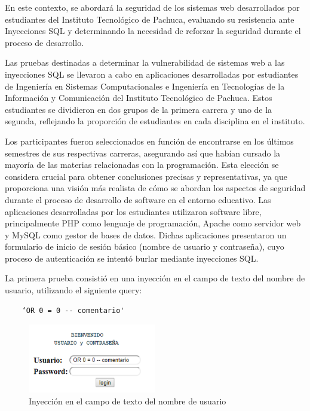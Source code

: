 \documentclass[11pt]{report}
\begin{document}
En este contexto, se abordará la seguridad de los sistemas web desarrollados por estudiantes del Instituto Tecnológico de Pachuca, evaluando su
resistencia ante Inyecciones SQL y determinando la necesidad de reforzar la seguridad durante el proceso de desarrollo.

Las pruebas destinadas a determinar la vulnerabilidad de sistemas web a las inyecciones SQL se llevaron a cabo en aplicaciones desarrolladas por
estudiantes de Ingeniería en Sistemas Computacionales e Ingeniería en Tecnologías de la Información y Comunicación del Instituto Tecnológico
de Pachuca. Estos estudiantes se dividieron en dos grupos de la primera carrera y uno de la segunda, reflejando la proporción de estudiantes en
cada disciplina en el instituto.

Los participantes fueron seleccionados en función de encontrarse en los últimos semestres de sus respectivas carreras, asegurando así que habían
cursado la mayoría de las materias relacionadas con la programación. Esta elección se considera crucial para obtener conclusiones
precisas y representativas, ya que proporciona una visión más realista de cómo se abordan los aspectos de seguridad durante el proceso de desarrollo
de software en el entorno educativo. Las aplicaciones desarrolladas por los estudiantes utilizaron software libre, principalmente PHP como lenguaje de
programación, Apache como servidor web y MySQL como gestor de bases de datos. Dichas aplicaciones presentaron un formulario de inicio de sesión básico
(nombre de usuario y contraseña), cuyo proceso de autenticación se intentó burlar mediante inyecciones SQL.

La primera prueba consistió en una inyección en el campo de texto del nombre de usuario, utilizando 
el siguiente query: 
\begin{center}
  \begin{BVerbatim}
    ‘OR 0 = 0 -- comentario'
  \end{BVerbatim}
\end{center}
\begin{figure}[H]
  \centering
  \includegraphics[width=0.5\textwidth]{img/inyeccion_1.png}
  \caption{Inyección en el campo de texto del nombre de usuario}
  \label{fig:inyeccion1}
\end{figure}
\end{document}
